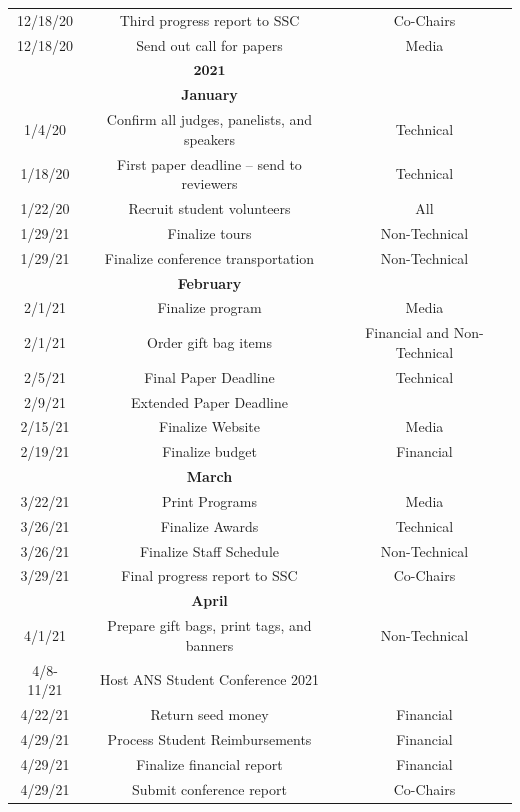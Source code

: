 \begin{center}
\begin{longtable}{c |  c  c}
12/18/20 & Third progress report to SSC& Co-Chairs\\
12/18/20 & Send out call for papers& Media\\
\hline\hline
&$\textbf{2021}$&\\
\hline\hline
&\textbf{January}&\\
\hline\hline
1/4/20 & Confirm all judges, panelists, and speakers& Technical\\
1/18/20 & First paper deadline -- send to reviewers & Technical\\
1/22/20 & Recruit student volunteers& All\\
1/29/21 & Finalize tours& Non-Technical\\
1/29/21& Finalize conference transportation& Non-Technical\\
\hline\hline
&\textbf{February}&\\
\hline\hline
2/1/21 & Finalize program& Media\\
2/1/21 & Order gift bag items & Financial and Non-Technical\\
2/5/21 & Final Paper Deadline& Technical\\
2/9/21 & Extended Paper Deadline& \\
2/15/21 & Finalize Website& Media\\
2/19/21 & Finalize budget& Financial\\
\hline\hline
&\textbf{March}&\\
\hline\hline
3/22/21 & Print Programs& Media\\
3/26/21 & Finalize Awards& Technical\\
3/26/21 & Finalize Staff Schedule& Non-Technical\\
3/29/21 & Final progress report to SSC& Co-Chairs\\
\hline\hline
&\textbf{April}&\\
\hline\hline
4/1/21 & Prepare gift bags, print tags, and banners& Non-Technical\\
4/8-11/21 & Host ANS Student Conference 2021 & \\
4/22/21 & Return seed money& Financial\\
4/29/21 & Process Student Reimbursements& Financial\\
4/29/21 & Finalize financial report& Financial\\
4/29/21 & Submit conference report& Co-Chairs\\
\hline\hline
\end{longtable}
\end{center}
